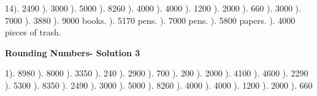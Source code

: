 \documentclass{article}%
\begin{document}
14). 2490%
). 3000%
). 5000%
). 8260%
). 4000%
). 4000%
). 1200%
). 2000%
). 660%
). 3000%
). 7000%
). 3880%
). 9000 books.%
). 5170 pens.%
). 7000 pens.%
). 5800 papers.%
). 4000 pieces of trash.%
\newline%
\newpage%
\large%
\begin{center}%
\textbf{Rounding Numbers- Solution 3}%
\newline%
\end{center} \normalsize%
1). 8980%
). 8000%
). 3350%
). 240%
). 2900%
). 700%
). 200%
). 2000%
). 4100%
). 4600%
). 2290%
). 5300%
). 8350%
). 2490%
). 3000%
). 5000%
). 8260%
). 4000%
). 4000%
). 1200%
). 2000%
). 660%
\newline%
\end{document}

